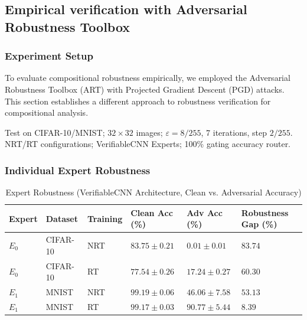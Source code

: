\documentclass[11pt,a4paper]{article}
\begin{document}
\subsection{Empirical verification with Adversarial Robustness Toolbox}

\subsubsection{Experiment Setup}

To evaluate compositional robustness empirically, we employed the Adversarial Robustness Toolbox (ART) with Projected Gradient Descent (PGD) attacks. This section establishes a different approach to robustness verification for compositional analysis.

Test on CIFAR-10/MNIST; $32 \times 32$ images; $\varepsilon = 8/255$, 7 iterations, step $2/255$. NRT/RT configurations; VerifiableCNN Experts; 100\% gating accuracy router.

\subsubsection{Individual Expert Robustness}

\begin{table}[H]
\centering
\small
\begin{tabular}{llllll}
\toprule
Expert & Dataset & Training & Clean Acc (\%) & Adv Acc (\%) & Robustness Gap (\%) \\
\midrule
$E_0$ & CIFAR-10 & NRT & $83.75 \pm 0.21$ & $0.01 \pm 0.01$ & $83.74$ \\
$E_0$ & CIFAR-10 & RT & $77.54 \pm 0.26$ & $17.24 \pm 0.27$ & $60.30$ \\
$E_1$ & MNIST & NRT & $99.19 \pm 0.06$ & $46.06 \pm 7.58$ & $53.13$ \\
$E_1$ & MNIST & RT & $99.17 \pm 0.03$ & $90.77 \pm 5.44$ & $8.39$ \\
\bottomrule
\end{tabular}
\caption{Expert Robustness (VerifiableCNN Architecture, Clean vs. Adversarial Accuracy)}
\end{table}
\end{document}
